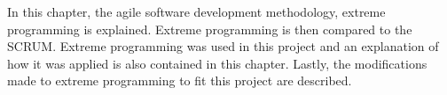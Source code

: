 In this chapter, the agile software development methodology, extreme programming is explained. Extreme programming is then compared to the  SCRUM. Extreme programming was used in this project and an explanation of how it was applied is also contained in this chapter. Lastly, the modifications made to extreme programming to fit this project are described.